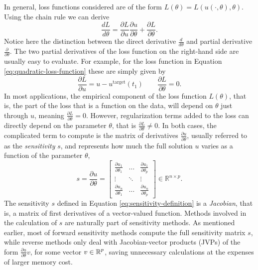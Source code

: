 In general, loss functions considered are of the form $L(\theta) = L(u(\cdot, \theta), \theta)$. 
Using the chain rule we can derive 
\begin{equation} 
 \frac{dL}{d\theta} = \frac{\partial L}{\partial u} \frac{\partial u}{\partial \theta} + \frac{\partial L}{\partial \theta}.
 \label{eq:dLdtheta_VJP}
\end{equation} 
Notice here the distinction between the direct derivative $\frac{d}{d\theta}$ and partial derivative $\frac{\partial}{\partial \theta}$.
The two partial derivatives of the loss function on the right-hand side are usually easy to evaluate.
For example, for the loss function in Equation \eqref{eq:quadratic-loss-function} these are simply given by 
\begin{equation}
    \frac{\partial L}{\partial u} = u - u^{\text{target}}(t_1)
    \qquad 
    \frac{\partial L}{\partial \theta} = 0.
    \label{eq:dLdu}
\end{equation}
In most applications, the empirical component of the loss function $L(\theta)$, that is, the part of the loss that is a function on the data, will depend on $\theta$ just through $u$, meaning $\frac{\partial L}{\partial \theta} = 0$. 
However, regularization terms added to the loss can directly depend on the parameter $\theta$, that is $\frac{\partial L}{\partial \theta} \neq 0$.
In both cases, the complicated term to compute is the matrix of derivatives $\frac{\partial u}{\partial \theta}$, usually referred to as the \textit{sensitivity} $s$, and represents how much the full solution $u$ varies as a function of the parameter $\theta$, 
\begin{equation}
 s 
 = 
 \frac{\partial u}{\partial \theta} 
 =
 \begin{bmatrix}
   \frac{\partial u_1}{\partial \theta_1} & \dots & \frac{\partial u_1}{\partial \theta_p} \\
   \vdots & \ddots & \vdots \\
   \frac{\partial u_n}{\partial \theta_1} & \dots & \frac{\partial u_n}{\partial \theta_p}
 \end{bmatrix}
 \in \mathbb R^{n \times p}.
 \label{eq:sensitivity-definition}
\end{equation}
The sensitivity $s$ defined in Equation \eqref{eq:sensitivity-definition} is a \textit{Jacobian}, that is, a matrix of first derivatives of a vector-valued function. 
Methods involved in the calculation of $s$ are naturally part of sensitivity methods.
As mentioned earlier, most of forward sensitivity methods compute the full sensitivity matrix $s$, while reverse methods only deal with Jacobian-vector products (JVPs) of the form $\frac{\partial u}{\partial \theta} v$, for some vector $v \in \operatorname{\mathbb{R}}^p$, saving unnecessary calculations at the expenses of larger memory cost.

